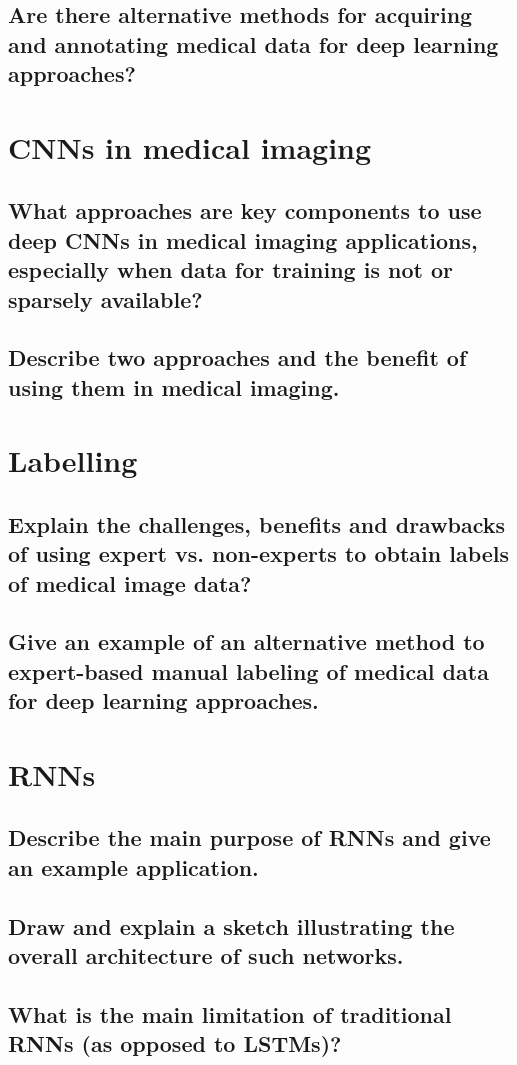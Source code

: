 \subsection{Are there alternative methods for acquiring and annotating medical data for deep learning approaches?}

\section{CNNs in medical imaging}
\subsection{What approaches are key components to use deep CNNs in medical imaging applications, especially when data for training is not or sparsely available?}
\subsection{Describe two approaches and the benefit of using them in medical imaging.}

\section{Labelling}
\subsection{Explain the challenges, benefits and drawbacks of using expert vs. non-experts to obtain labels of medical image data?}
\subsection{Give  an example of an alternative method to expert-based manual labeling of medical data for deep learning approaches.}

\section{RNNs}
\subsection{Describe the main purpose of RNNs and give an example application.}
\subsection{Draw and explain a sketch illustrating the overall  architecture of such networks.}
\subsection{What is the main limitation of traditional RNNs (as opposed to LSTMs)?}

